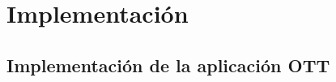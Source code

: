 \chapter{Implementación}
\label{sec:implementacion}



\section{Implementación de la aplicación OTT}

